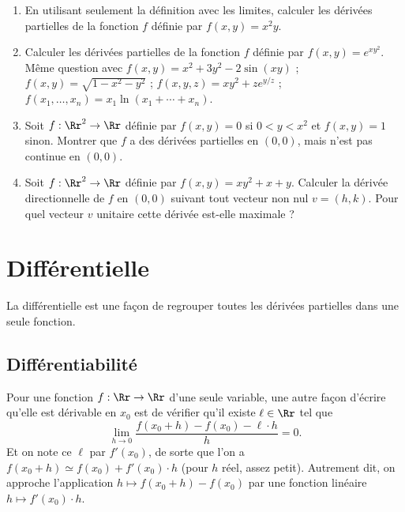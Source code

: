 \documentclass[11pt, class=report,crop=false]{standalone}
\begin{document}
\begin{miniexercices}
\sauteligne
\begin{enumerate}
  \item En utilisant seulement la définition avec les limites, calculer les dérivées partielles de la fonction $f$ définie par $f(x,y) = x^2y$.
  
  \item Calculer les dérivées partielles de la fonction $f$ définie par  $f(x,y) = e^{xy^2}$. Même question avec $f(x,y) = x^2 + 3y^2 - 2\sin(xy)$ ; $f(x,y) = \sqrt{1 - x^2 - y^2}$ ; $f(x,y,z) = xy^2 + ze^{y/z}$ ; $f(x_1,\ldots,x_n)= x_1\ln(x_1+\cdots+x_n)$.

  \item Soit $f : \Rr^2 \to \Rr$ définie par $f(x,y) = 0$ si $0 < y < x^2$ et $f(x,y)=1$ sinon.
Montrer que $f$ a des dérivées partielles en $(0,0)$, mais n'est pas continue en $(0,0)$.

  \item Soit $f : \Rr^2 \to \Rr$ définie par $f(x,y) = xy^2+x+y$. Calculer la dérivée directionnelle de $f$ en $(0,0)$ suivant tout vecteur non nul $v=(h,k)$. Pour quel vecteur $v$ unitaire cette dérivée est-elle maximale ?
  
\end{enumerate}
\end{miniexercices}





\section{Différentielle}


La différentielle est une façon de regrouper toutes les dérivées partielles dans une seule fonction.

\subsection{Différentiabilité}


Pour une fonction $f : \Rr \to \Rr$ d'une seule variable, une autre façon d'écrire qu'elle est dérivable en $x_0$ est de vérifier qu'il existe $\ell \in \Rr$ tel que 
$$\lim_{h \rightarrow 0} \frac{f(x_0 + h) - f(x_0) - \ell \cdot h}{h} = 0.$$
Et on note ce $\ell$ par $f'(x_0)$, de sorte que l'on a 
$f(x_0+h) \simeq f(x_0) + f'(x_0)\cdot h$ (pour $h$ réel, assez petit).
Autrement dit, on approche l'application $h \mapsto f(x_0+h) - f(x_0)$
par une fonction linéaire $h \mapsto f'(x_0) \cdot h$.
\end{document}
